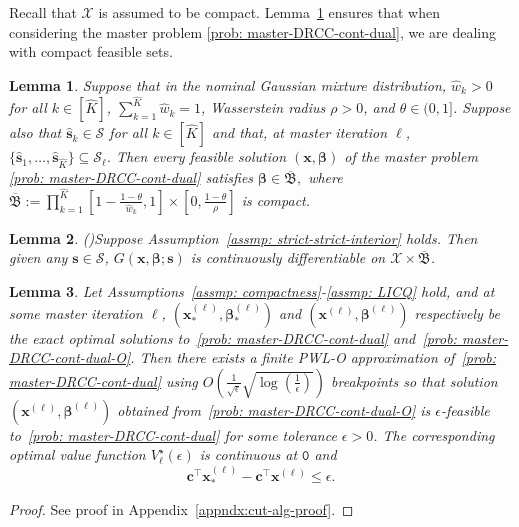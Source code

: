 \documentclass[opre,sglanonrev]{informs4}
\newtheorem{lemma}{Lemma}
\newcommand{\mS}{\mathcal{S}}
\newcommand{\mX}{\mathcal{X}}
\newcommand{\mfB}{\mathfrak{B}}
\newcommand{\bbeta}{\bm{\beta}}
\newcommand{\bc}{\bm{c}}
\newcommand{\bs}{\bm{s}}
\newcommand{\bx}{\bm{x}}
\begin{document}
{Recall that $\mX$ is assumed to be compact. 
Lemma~\ref{lem:beta-compactification} ensures that when considering the master problem \eqref{prob: master-DRCC-cont-dual}, we are dealing with compact feasible sets.
\begin{lemma}
\label{lem:beta-compactification}
Suppose that in the nominal Gaussian mixture distribution, $\hat w_k>0$ for all $k\in[\hat K]$,
$\sum_{k=1}^{\hat K}\hat w_k=1$, Wasserstein radius $\rho>0$, and
$\theta\in(0,1]$. Suppose also that
$\hat{\bs}_k\in\mS$ for all $k\in[\hat K]$ and that, at master iteration
$\ell$, $\{\hat{\bs}_1,\ldots,\hat{\bs}_{\hat K}\}\subseteq \mS_\ell.$ Then every feasible solution $(\bx,\bbeta)$ of the master problem \eqref{prob: master-DRCC-cont-dual} satisfies $\bbeta\in\overline{\mathfrak B},$
where $\overline{\mathfrak B}
:=
\prod_{k=1}^{\hat K}
\left[
1-\frac{1-\theta}{\hat w_k},
1
\right]
\times
\left[
0,\frac{1-\theta}{\rho}
\right]$ 
is compact.
\end{lemma}

\begin{lemma}(\cite[Lemma~2-3]{dey2025solving})\label{lem: G-diff-continuity-x}
Suppose Assumption~\ref{assmp: strict-strict-interior} holds. Then given any $\bs \in \mS$, $G(\bx, \bbeta; \bs)$ is continuously differentiable on $\mX \times \overline{\mfB}$.
\end{lemma}



\begin{lemma}\label{lem: optimality-master-problem}
Let Assumptions~\ref{assmp: compactness}-\ref{assmp: LICQ} hold, and at some master iteration $\ell$, $(\bx^{(\ell)}_*, \bbeta^{(\ell)}_*)$ and $(\bx^{(\ell)}, \bbeta^{(\ell)})$ respectively be the exact optimal solutions to~\eqref{prob: master-DRCC-cont-dual} and~\eqref{prob: master-DRCC-cont-dual-O}. Then there exists a finite PWL-O approximation of~\eqref{prob: master-DRCC-cont-dual} using  $O(\frac{1} {\sqrt{\epsilon}} \sqrt{\log(\frac{1}{\epsilon})})$ breakpoints so that  solution $(\bx^{(\ell)}, \bbeta^{(\ell)})$ obtained from~\eqref{prob: master-DRCC-cont-dual-O} is $\epsilon$-feasible to~\eqref{prob: master-DRCC-cont-dual} for some tolerance $\epsilon > 0$. The corresponding optimal value function $V^\star_\ell(\epsilon)$ is continuous at $\mathtt{0}$ and \[\bc^\top \bx^{(\ell)}_* - \bc^\top \bx^{(\ell)} \leq \epsilon.\] 
\end{lemma}

\begin{proof}
  See proof in Appendix~\ref{appndx:cut-alg-proof}. 
\end{proof}

}
\end{document}
